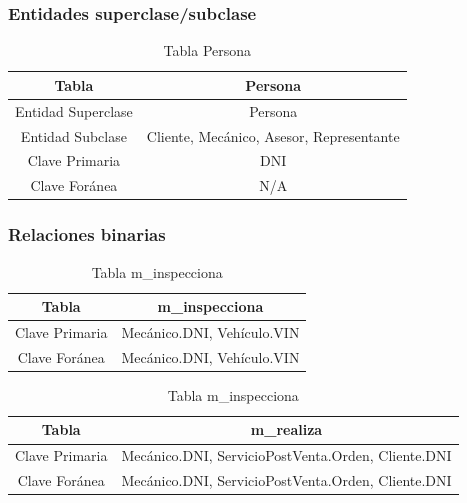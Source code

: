 \documentclass[12pt]{article}
\begin{document}
\newpage

\subsubsection{Entidades superclase/subclase}

\begin{table}[htbp]
\begin{center}
\begin{tabular}{|c|c|}
\hline
Tabla & Persona \\
\hline
Entidad Superclase & Persona \\
\hline
Entidad Subclase & Cliente, Mecánico, Asesor, Representante \\
\hline
Clave Primaria & DNI \\
\hline
Clave Foránea & N/A \\
\hline
\end{tabular}        
\caption{Tabla Persona}
\label{tab:tablas}
\end{center}
\end{table}

\newpage

\subsubsection{Relaciones binarias}

\begin{table}[htbp]
\begin{center}
\begin{tabular}{|c|c|}
\hline
Tabla & m\_inspecciona \\
\hline
Clave Primaria & Mecánico.DNI, Vehículo.VIN \\
\hline
Clave Foránea & Mecánico.DNI, Vehículo.VIN \\
\hline
\end{tabular}
\caption{Tabla m\_inspecciona}
\label{tab:tablas}
\end{center}
\end{table}

\begin{table}[htbp]
\begin{center}
\begin{tabular}{|c|c|}
\hline
Tabla & m\_realiza \\
\hline
Clave Primaria & Mecánico.DNI, ServicioPostVenta.Orden, Cliente.DNI \\
\hline
Clave Foránea & Mecánico.DNI, ServicioPostVenta.Orden, Cliente.DNI \\
\hline
\end{tabular}
\caption{Tabla m\_inspecciona}
\label{tab:tablas}
\end{center}
\end{table}
\end{document}
